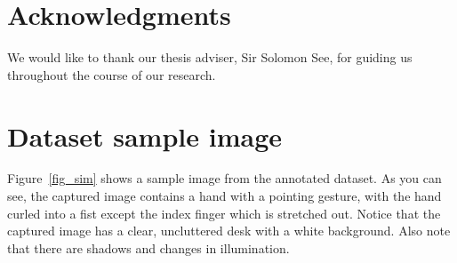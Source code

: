 \documentclass{acm_proc_article-sp}
\begin{document}
\section{Acknowledgments}

We would like to thank our thesis adviser, Sir Solomon See, for guiding us throughout the course of our research.


%

%
%
\appendix
\section{Dataset sample image}
\label{sample_dataset}
Figure~\ref{fig_sim} shows a sample image from the annotated dataset. As you can see, the captured image contains a hand with a pointing gesture, with the hand curled into a fist except the index finger which is stretched out. Notice that the captured image has a clear, uncluttered desk with a white background. Also note that there are shadows and changes in illumination.


\end{document}
